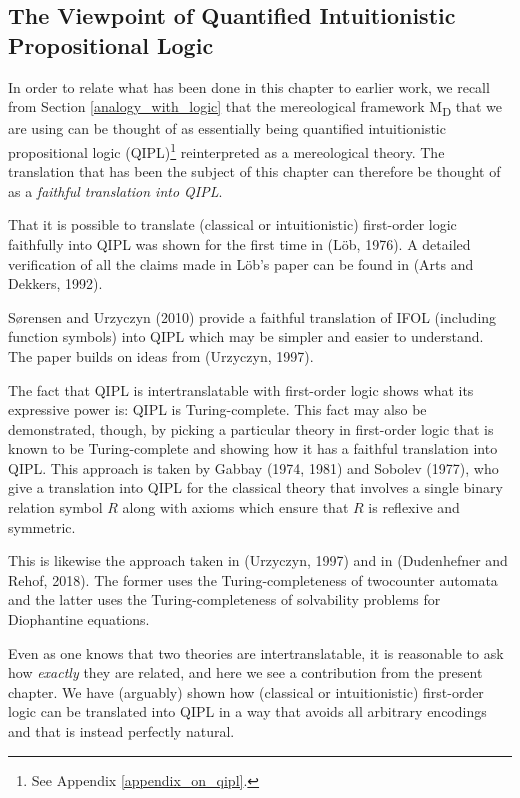 \documentclass[12pt]{book}
\begin{document}
\begin{subappendices}
\section{The Viewpoint of Quantified Intuitionistic Propositional Logic} \label{viewpoint_of_qipl}
In order to relate what has been done in this chapter to earlier work, we recall from Section \ref{analogy_with_logic} that the mereological framework M\textsubscript{D} that we are using can be thought of as essentially being quantified intuitionistic propositional logic (QIPL)\footnote{See Appendix \ref{appendix_on_qipl}.} reinterpreted as a mereological theory. The translation that has been the subject of this chapter can therefore be thought of as a \textit{faithful translation into QIPL}.

That it is possible to translate (classical or intuitionistic) first-order logic faithfully into QIPL was shown for the first time in (Löb, 1976). A detailed verification of all the claims
made in Löb’s paper can be found in (Arts and Dekkers, 1992).

Sørensen and Urzyczyn (2010) provide a faithful translation of IFOL (including function symbols) into QIPL which may be simpler and easier to understand. The paper builds on ideas from (Urzyczyn, 1997).

The fact that QIPL is intertranslatable with first-order logic shows what its expressive power is: QIPL is Turing-complete. This fact may also be demonstrated, though, by picking a particular theory in first-order logic that is known to be Turing-complete and showing how it has a faithful translation into QIPL.  This approach is taken by Gabbay (1974, 1981) and Sobolev (1977), who give a translation into QIPL for the classical theory that involves a single binary relation symbol $R$ along with axioms which ensure that $R$ is reflexive and symmetric.

This is likewise the approach taken in (Urzyczyn, 1997) and in (Dudenhefner and Rehof, 2018). The former uses the Turing-completeness of twocounter automata and the latter uses the Turing-completeness of solvability problems for Diophantine equations.

Even as one knows that two theories are intertranslatable, it is reasonable to ask how \textit{exactly} they are related, and here we see a contribution from the present chapter. We have (arguably) shown how (classical or intuitionistic) first-order logic can be translated into QIPL in a way that avoids all arbitrary encodings and that is instead perfectly natural.


\end{subappendices}
\end{document}

